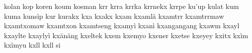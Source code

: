 kolan\hspace{2mm}
kop\hspace{2mm}
koren\hspace{2mm}
koum\hspace{2mm}
kosman\hspace{2mm}
krr\hspace{2mm}
krra\hspace{2mm}
krrka\hspace{2mm}
krrnekx\hspace{2mm}
krrpe\hspace{2mm}
ku'up\hspace{2mm}
kulat\hspace{2mm}
kum\hspace{2mm}
kuma\hspace{2mm}
kunsìp\hspace{2mm}
kur\hspace{2mm}
kurakx\hspace{2mm}
kxa\hspace{2mm}
kxakx\hspace{2mm}
kxam\hspace{2mm}
kxamlä\hspace{2mm}
kxamtrr\hspace{2mm}
kxamtrrmaw\hspace{2mm}
kxamtxomaw\hspace{2mm}
kxamtxon\hspace{2mm}
kxamtseng\hspace{2mm}
kxamyì\hspace{2mm}
kxanì\hspace{2mm}
kxangangang\hspace{2mm}
kxawm\hspace{2mm}
kxayl\hspace{2mm}
kxaylte\hspace{2mm}
kxaylyì\hspace{2mm}
kxänäng\hspace{2mm}
kxeltek\hspace{2mm}
kxem\hspace{2mm}
kxemyo\hspace{2mm}
kxener\hspace{2mm}
kxetse\hspace{2mm}
kxeyey\hspace{2mm}
kxitx\hspace{2mm}
kxìm\hspace{2mm}
kxìmyu\hspace{2mm}
kxll\hspace{2mm}
kxll si\hspace{2mm}
